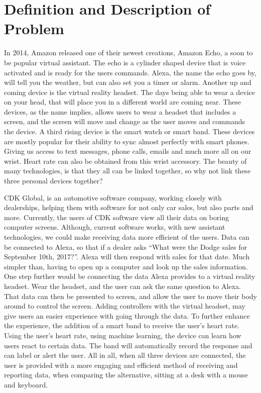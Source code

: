 \documentclass[onecolumn, draftclsnofoot,10pt, compsoc]{IEEEtran}
\begin{document}
\newpage
{}
\tableofcontents
\clearpage

\section{Definition and Description of Problem}
	In 2014, Amazon released one of their newest creations, Amazon Echo, a soon to be popular virtual assistant. The echo is a cylinder shaped device that is voice activated and is
	ready for the users commands. Alexa, the name the echo goes by, will tell you the weather, but can also set you a timer or alarm. Another up and coming device is the virtual reality
	headset. The days being able to wear a device on your head, that will place you in a different world are coming near. These devices, as the name implies, allows users to wear a headset 
	that includes a screen, and the screen will move and change as the user moves and commands the device. A third rising device is the smart watch or smart band. These devices are mostly
	popular for their ability to sync almost perfectly with smart phones. Giving us access to text messages, phone calls, emails and much more all on our wrist. Heart rate can also
	be obtained from this wrist accessory. The beauty of many technologies, is that they all can be linked together, so why not link these three personal devices together?
	
	CDK Global, is an automotive software company, working closely with dealerships, helping them with software for not only car sales, but also parts and more. Currently, the users of CDK software
	view all their data on boring computer screens. Although, current software works, with new assistant technologies, we could make receiving data more efficient of the users. Data can be connected
	to Alexa, so that if a dealer asks ``What were the Dodge sales for September 10th, 2017?''. Alexa will then respond with sales for that date. Much simpler than, having to open up a computer and look
	up the sales information. One step further would be connecting the data Alexa provides to a virtual reality headset. Wear the headset, and the user can ask the same question to Alexa. That data can 
	then be presented to screen, and allow the user to move their body around to control the screen. Adding controllers with the virtual headset, may give users an easier experience with going through the 
	data. To further enhance the experience, the addition of a smart band to receive the user’s heart rate.  Using the user’s heart rate, using machine learning, the device can learn how users react to certain 
	data. The band will automatically record the response and can label or alert the user. All in all, when all three devices are connected, the user is provided with a more engaging and efficient method of receiving
	and reporting data, when comparing the alternative, sitting at a desk with a mouse and keyboard. 
	
\end{document}
